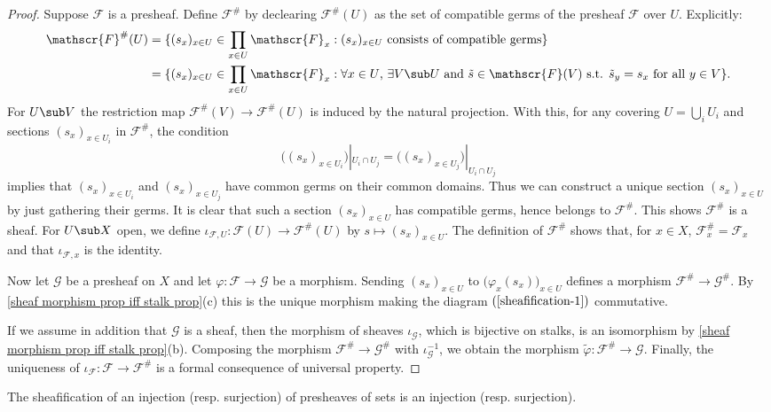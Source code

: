 \begin{proof}
Suppose $\mathscr{F}$ is a presheaf. Define $\mathscr{F}^{\#}$ by declearing $\mathscr{F}^{\#}(U)$ as the set of compatible germs of the presheaf $\mathscr{F}$ over $U$. Explicitly:
\begin{align*}
\mathscr{F}^{\#}(U)&=\{(s_x)_{x\in U}\in\prod_{x\in U}\mathscr{F}_x:\text{$(s_x)_{x\in U}$ consists of compatible germs}\}\\
&=\{(s_x)_{x\in U}\in\prod_{x\in U}\mathscr{F}_x:\text{$\forall x\in U$, $\exists V\sub U$ and $\tilde{s}\in\mathscr{F}(V)$ s.t. $\tilde{s}_{y}=s_x$ for all $y\in V$}\}.
\end{align*}
For $U\sub V$ the restriction map $\mathscr{F}^{\#}(V)\to\mathscr{F}^{\#}(U)$ is induced by the natural projection. With this, for any covering $U=\bigcup_iU_i$ and sections $(s_x)_{x\in U_i}$ in $\mathscr{F}^{\#}$, the condition
\[\big((s_x)_{x\in U_i}\big)|_{U_i\cap U_j}=\big((s_x)_{x\in U_j}\big)|_{U_i\cap U_j}\]
implies that $(s_x)_{x\in U_i}$ and $(s_x)_{x\in U_j}$ have common germs on their common domains. Thus we can construct a unique section $(s_x)_{x\in U}$ by just gathering their germs. It is clear that such a section $(s_x)_{x\in U}$ has compatible germs, hence belongs to $\mathscr{F}^{\#}$. This shows $\mathscr{F}^{\#}$ is a sheaf. For $U\sub X$ open, we define $\iota_{\mathscr{F},U}:\mathscr{F}(U)\to\mathscr{F}^{\#}(U)$ by $s\mapsto(s_x)_{x\in U}$. The definition of $\mathscr{F}^{\#}$ shows that, for $x\in X$, $\mathscr{F}^{\#}_x=\mathscr{F}_x$ and that $\iota_{\mathscr{F},x}$ is the identity.\par
Now let $\mathscr{G}$ be a presheaf on $X$ and let $\varphi:\mathscr{F}\to\mathscr{G}$ be a morphism. Sending $(s_x)_{x\in U}$ to $\big(\varphi_x(s_x)\big)_{x\in U}$ defines a morphism $\mathscr{F}^{\#}\to\mathscr{G}^{\#}$. By \cref{sheaf morphism prop iff stalk prop}(c) this is the unique morphism making the diagram $(\ref{sheafification-1})$ commutative.\par
If we assume in addition that $\mathscr{G}$ is a sheaf, then the morphism of sheaves $\iota_{\mathscr{G}}$, which is bijective on stalks, is an isomorphism by \cref{sheaf morphism prop iff stalk prop}(b). Composing the morphism $\mathscr{F}^{\#}\to\mathscr{G}^{\#}$ with $\iota_{\mathscr{G}}^{-1}$, we obtain the morphism $\tilde{\varphi}:\mathscr{F}^{\#}\to\mathscr{G}$. Finally, the uniqueness of $\iota_{\mathscr{F}}:\mathscr{F}\to\mathscr{F}^{\#}$ is a formal consequence of universal property.
\end{proof}
\begin{proposition}\label{sheaf sheafification on morphism prop}
The sheafification of an injection (resp. surjection) of presheaves of sets is an injection (resp. surjection).
\end{proposition}
